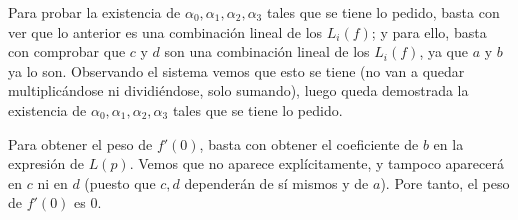 \begin{ejercicio}
    Para probar la existencia de $\alpha_0, \alpha_1, \alpha_2, \alpha_3$ tales que se tiene lo pedido, basta con ver que lo anterior es una combinación lineal de los $L_i(f)$; y para ello, basta con comprobar que $c$ y $d$ son una combinación lineal de los $L_i(f)$, ya que $a$ y $b$ ya lo son. Observando el sistema vemos que esto se tiene (no van a quedar multiplicándose ni dividiéndose, solo sumando), luego queda demostrada la existencia de $\alpha_0, \alpha_1, \alpha_2, \alpha_3$ tales que se tiene lo pedido.

    Para obtener el peso de $f'(0)$, basta con obtener el coeficiente de $b$ en la expresión de $L(p)$. Vemos que no aparece explícitamente, y tampoco aparecerá en $c$ ni en $d$ (puesto que $c,d$ dependerán de sí mismos y de $a$). Pore tanto, el peso de $f'(0)$ es $0$.
\end{ejercicio}

